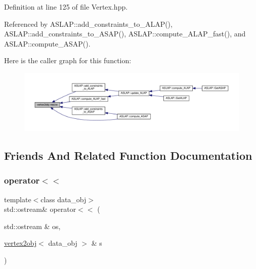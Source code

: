 Definition at line 125 of file Vertex.\+hpp.



Referenced by A\+S\+L\+A\+P\+::add\+\_\+constraints\+\_\+to\+\_\+\+A\+L\+A\+P(), A\+S\+L\+A\+P\+::add\+\_\+constraints\+\_\+to\+\_\+\+A\+S\+A\+P(), A\+S\+L\+A\+P\+::compute\+\_\+\+A\+L\+A\+P\+\_\+fast(), and A\+S\+L\+A\+P\+::compute\+\_\+\+A\+S\+A\+P().

Here is the caller graph for this function\+:
\nopagebreak
\begin{figure}[H]
\begin{center}
\leavevmode
\includegraphics[width=350pt]{d4/d5c/structvertex2obj_aab30f1c6b751f7679864447ce2f795e2_icgraph}
\end{center}
\end{figure}


\subsection{Friends And Related Function Documentation}
\mbox{\label{structvertex2obj_af8bfba9b533e41499a34caf198715262}} 
\subsubsection{\texorpdfstring{operator$<$$<$}{operator<<}\hspace{0.1cm}{\footnotesize\ttfamily [1/2]}}
{\footnotesize\ttfamily template$<$class data\+\_\+obj$>$ \\
std\+::ostream\& operator$<$$<$ (\begin{DoxyParamCaption}\item[{std\+::ostream \&}]{os,  }\item[{\hyperlink{structvertex2obj}{vertex2obj}$<$ data\+\_\+obj $>$ \&}]{s }\end{DoxyParamCaption})\hspace{0.3cm}{\ttfamily [friend]}}



